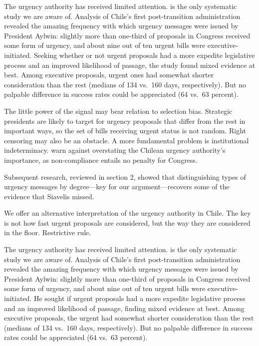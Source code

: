 The urgency authority has received limited attention. \citet{siavelis.2002} is the only systematic study we are aware of. Analysis of Chile's first post-transition administration revealed the amazing frequency with which urgency messages were issued by President Aylwin: slightly more than one-third of proposals in Congress received some form of urgency, and about nine out of ten urgent bills were executive-initiated. Seeking whether or not urgent proposals had a more expedite legislative process and an improved likelihood of passage, the study found mixed evidence at best. Among executive proposals, urgent ones had somewhat shorter consideration than the rest (medians of 134 vs.\ 160 days, respectively). But no palpable difference in success rates could be appreciated (64 vs.\ 63 percent). 

The little power of the signal may bear relation to selection bias. Strategic presidents are likely to target for urgency proposals that differ from the rest in important ways, so the set of bills receiving urgent status is not random. Right censoring may also be an obstacle. A more fundamental problem is institutional indeterminacy. \citet{berrios.gamboa.fiscChile.2006} warn against overstating the Chilean urgency authority's importance, as non-compliance entails no penalty for Congress. %

Subsequent research, reviewed in section 2, showed that distinguishing types of urgency messages by degree---key for our argument---recovers some of the evidence that Siavelis missed. 

We offer an alternative interpretation of the urgency authority in Chile. The key is not how fast urgent proposals are considered, but the way they are considered in the floor. Restrictive rule. 


The urgency authority has received limited attention. \citet{siavelis.2002} is the only systematic study we are aware of. Analysis of Chile's first post-transition administration revealed the amazing frequency with which urgency messages were issued by President Aylwin: slightly more than one-third of proposals in Congress received some form of urgency, and about nine out of ten urgent bills were executive-initiated. He sought if urgent proposals had a more expedite legislative process and an improved likelihood of passage, finding mixed evidence at best. Among executive proposals, the urgent had somewhat shorter consideration than the rest (medians of 134 vs.\ 160 days, respectively). But no palpable difference in success rates could be appreciated (64 vs.\ 63 percent). 

